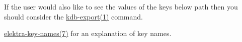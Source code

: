 \begin{DoxyItemize}
\item If the user would also like to see the values of the keys below {\ttfamily path} then you should consider the \mbox{\hyperlink{doc_help_kdb-export_md}{kdb-\/export(1)}} command.
\item \mbox{\hyperlink{doc_help_elektra-key-names_md}{elektra-\/key-\/names(7)}} for an explanation of key names. 
\end{DoxyItemize}
